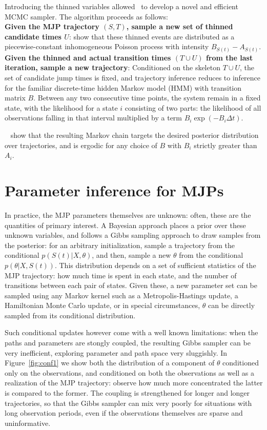 Introducing the thinned variables allowed~\cite{RaoTeh13} to develop
a novel and efficient MCMC sampler. The algorithm proceeds as follows:\\
\textbf{Given the MJP trajectory $(S,T)$, sample a new set of thinned 
candidate times $U$}: \cite{RaoTeh12} show that these thinned events
are distributed as a piecewise-constant inhomogeneous Poisson process
with intensity $B_{S(t)}-A_{S(t)}$.\\
\textbf{Given the thinned and actual transition times $(T \cup U)$
    from the last iteration, sample a new trajectory}:
    Conditioned on the skeleton $T \cup U$, the set of candidate jump
    times is fixed, and trajectory inference reduces to inference for
    the familiar discrete-time hidden Markov model (HMM) with transition
    matrix $B$. Between any two consecutive time points, the system
    remain in a fixed state, with the likelihood for a state $i$ consisting
    of two parts: the likelihood of all observations falling in that 
    interval multiplied by a term $B_i\exp(-B_i\Delta t)$.

    ~\cite{RaoTeh12} show that the resulting Markov chain targets
    the desired posterior distribution over trajectories, and is 
    ergodic for any choice of $B$ with $B_i$ strictly greater than
    $A_i$.

\section{Parameter inference for MJPs}
In practice, the MJP parameters themselves are unknown: often,
these are the quantities of primary interest. A Bayesian approach
places a prior over these unknown variables, and follows a
Gibbs sampling approach to draw samples from the posterior:
for an arbitrary initialization, sample a trajectory from the
conditional $p(S(t)|X,\theta)$, and then, sample a new $\theta$
from the conditional $p(\theta|X,S(t))$. This distribution depends
on a set of sufficient statistics of the MJP trajectory: how
much time is spent in each state, and the number of transitions
between each pair of states. Given these, a new parameter set
can be sampled using any Markov kernel such as a Metropolis-Hastings
update, a Hamiltonian Monte Carlo update, or in special circumstances,
$\theta$ can be directly sampled from its conditional distribution.

Such conditional updates however come with a well known limitations:
when the paths and parameters are stongly coupled, the resulting
Gibbs sampler can be very inefficient, exploring parameter and
path space very sluggishly. In Figure~\ref{fig:conf1} we show
both the distribution of a component of $\theta$ conditioned
only on the observations, and conditioned on both the observations 
as well as a realization of the MJP trajectory: observe how much
more concentrated the latter is compared to the former. The
coupling is strengthened for longer and longer trajectories, so
that the Gibbs sampler can mix very poorly for situations with
long observation periods, even if the observations themselves are
sparse and uninformative.

